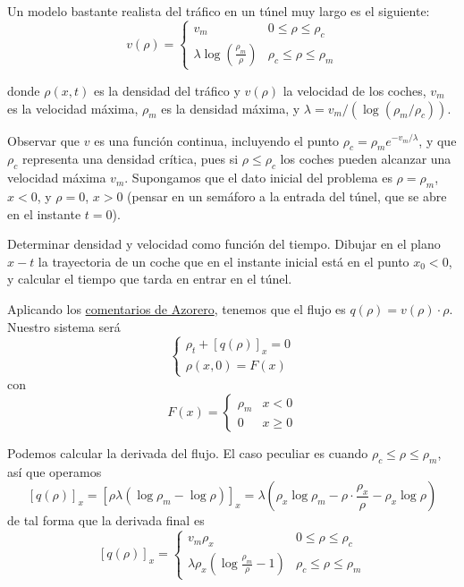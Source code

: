 \begin{problem}[4] Un modelo bastante realista del tráfico en un túnel muy largo es el siguiente:
	$$v(\rho) =
	\begin{cases}
		v_m & 0 \leq \rho \leq \rho_c \\
		\lambda \log (\frac{\rho_m}{\rho}) & \rho_c \leq \rho \leq \rho_m
	\end{cases}$$

	donde $\rho(x,t)$ es la densidad del tráfico y $v(\rho)$ la velocidad de los coches, $v_m$ es la velocidad máxima, $\rho_m$ es la densidad máxima, y $\lambda = v_m /(\log (\rho_m / \rho_c))$.

	Observar que $v$ es una función continua, incluyendo el punto $\rho_c = \rho_m e^{-v_m / \lambda}$, y que $\rho_c$ representa una densidad crítica, pues si $\rho \leq \rho_c$ los coches pueden alcanzar una velocidad máxima $v_m$. Supongamos que el dato inicial del problema es $\rho = \rho_m$, $x<0$, y $\rho = 0$, $x > 0$ (pensar en un semáforo a la entrada del túnel, que se abre en el instante $t = 0$).

	\ppart Determinar densidad y velocidad como función del tiempo.
	\ppart Dibujar en el plano $x - t$ la trayectoria de un coche que en el instante inicial está en el punto $x_0 < 0$, y calcular el tiempo que tarda en entrar en el túnel.

	\solution

	\spart

	Aplicando los \href{https://moodle.uam.es/pluginfile.php/910610/mod_resource/content/1/Problema4.pdf}{comentarios de Azorero}, tenemos que el flujo es $q(ρ) = v(ρ) · ρ$. Nuestro sistema será
	\[
	\begin{cases}
		ρ_t + [q(ρ)]_x = 0 \\
		ρ(x,0) = F(x)
	\end{cases}\] con \[ F(x) = \begin{cases} ρ_m & x < 0 \\ 0 & x ≥ 0 \end{cases} \]

	Podemos calcular la derivada del flujo. El caso peculiar es cuando $ρ_c ≤ ρ ≤ ρ_m$, así que operamos \[ [q(ρ)]_x = [ρ λ \left(\log ρ_m - \log ρ\right)]_x = λ(ρ_x \log ρ_m - ρ · \frac{ρ_x}{ρ} - ρ_x \log ρ) \] de tal forma que la derivada final es \[ [q(ρ)]_x = \begin{cases}
	v_m ρ_x & 0 ≤ ρ ≤ ρ_c \\
	λρ_x\left(\log \frac{ρ_m}{ρ} - 1\right) & ρ_c ≤ ρ ≤ ρ_m \end{cases}
	\]


\end{problem}
